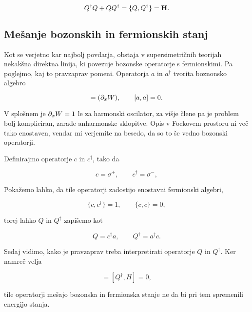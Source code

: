\begin{equation}
	Q^\dagger Q + QQ^\dagger = \{Q, Q^\dagger\} = \mathbf{H}.
\end{equation}

\subsection{Me\v sanje bozonskih in fermionskih stanj}

Kot se verjetno kar najbolj povdarja, obstaja v supersimetri\v cnih teorijah nekak\v sna direktna linija,
ki povezuje bozonske operatorje s fermionskimi. Pa poglejmo, kaj to pravzaprav pomeni. Operatorja
$a$ in $a^\dagger$ tvorita boznonsko algebro

\begin{equation}
	[a, a^\dagger] = (\px W), \qquad [a, a] = 0.
\end{equation}

V splo\v snem je $\partial_x W = 1$ le za harmonski oscilator, za vi\v sje \v clene pa je problem bolj
kompliciran, zarade anharmonske sklopitve. Opis v Fockovem prostoru ni ve\v c tako enostaven, vendar
mi verjemite na besedo, da so to \v se vedno bozonski operatorji.

Definirajmo operatorje $c$ in $c^\dagger$, tako da

\begin{equation}
	c = \sigma^+, \qquad c^\dagger = \sigma^-,
\end{equation}

Poka\v zemo lahko, da tile operatorji zadostijo enostavni fermionski algebri,

\begin{equation}
	\{c, c^\dagger\} = 1, \qquad \{c, c\} = 0,
\end{equation}

torej lahko $Q$ in $Q^\dagger$ zapi\v semo kot

\begin{equation}
	Q = c^\dagger a, \qquad Q^\dagger = a^\dagger c.
\end{equation}

Sedaj vidimo, kako je pravzaprav treba interpretirati operatorje $Q$ in $Q^\dagger$. Ker namre\v c
velja

\begin{equation}
	[Q, H] = [Q^\dagger, H] = 0,
\end{equation}

tile operatorji me\v sajo bozonska in fermionska stanje ne da bi pri tem spremenili energijo stanja.

